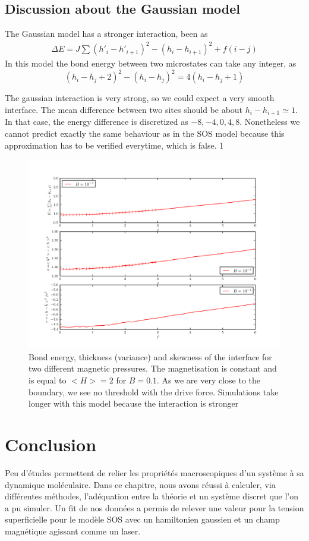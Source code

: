 	\subsection{Discussion about the Gaussian model}
	
The Gaussian model has a stronger interaction, been as
\begin{align}
	\Delta E = J \sum (h'_i-h'_{i+1})^2 -(h_i-h_{i+1})^2+ f (i-j)
\end{align}
In this model the bond energy between two microstates can take any integer, as 
\begin{equation*}
	(h_i-h_j+2)^2 - (h_i-h_j)^2 = 4 (h_i-h_j+1)
\end{equation*}

The gaussian interaction is very strong, so we could expect a very smooth interface. The mean difference between two sites should be about $h_i-h_{i+1} \simeq 1$. In that case, the energy difference is discretized as ${-8,-4,0,4,8}$. 
Nonetheless we cannot predict exactly the same behaviour as in the SOS model because this approximation has to be verified everytime, which is false. 1

\begin{figure}
	\includegraphics[width=\linewidth]{./sosequi-laser/gauss0.pdf}
	\caption{Bond energy, thickness (variance) and skewness of the interface for two different magnetic pressures. The magnetisation is constant and is equal to $<H>=2$ for $B=0.1$. As we are very close to the boundary, we see no threshold with the drive force. Simulations take longer with this model because the interaction is stronger}
\end{figure}


    \section{Conclusion}

Peu d'études permettent de relier les propriétés macroscopiques d'un système à sa dynamique moléculaire. Dans ce chapitre, nous avons réussi à calculer, via différentes méthodes, l'adéquation entre la théorie et un système discret que l'on a pu simuler. Un fit de nos données a permis de relever une valeur pour la tension superficielle pour le modèle SOS avec un hamiltonien gaussien et un champ magnétique agissant comme un laser. 